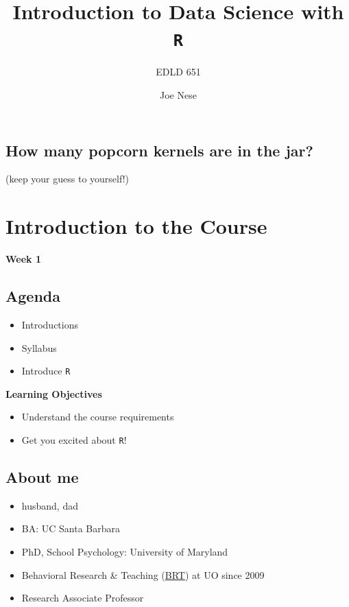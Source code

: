 \documentclass[
  letterpaper,
  DIV=11,
  numbers=noendperiod,
  oneside]{scrartcl}
\title{Introduction to Data Science with \texttt{R}}
\subtitle{EDLD 651}
\author{Joe Nese}
\date{}
\providecommand{\tightlist}{%
  \setlength{\itemsep}{0pt}\setlength{\parskip}{0pt}}\usepackage{longtable,booktabs,array}
\begin{document}
\maketitle
\ifdefined\Shaded\renewenvironment{Shaded}{\begin{tcolorbox}[borderline west={3pt}{0pt}{shadecolor}, boxrule=0pt, interior hidden, breakable, enhanced, sharp corners, frame hidden]}{\end{tcolorbox}}\fi

\hypertarget{how-many-popcorn-kernels-are-in-the-jar}{%
\subsection{How many popcorn kernels are in the
jar?}\label{how-many-popcorn-kernels-are-in-the-jar}}

(keep your guess to yourself!)

\hypertarget{introduction-to-the-course}{%
\section{Introduction to the Course}\label{introduction-to-the-course}}

\textbf{Week 1}

\hypertarget{agenda}{%
\subsection{Agenda}\label{agenda}}

\begin{itemize}
\tightlist
\item
  Introductions
\item
  Syllabus
\item
  Introduce \texttt{R}
\end{itemize}

\textbf{Learning Objectives}

\begin{itemize}
\tightlist
\item
  Understand the course requirements
\item
  Get you excited about \texttt{R}!
\end{itemize}

\hypertarget{about-me}{%
\subsection{About me}\label{about-me}}

\begin{itemize}
\tightlist
\item
  husband, dad
\item
  BA: UC Santa Barbara
\item
  PhD, School Psychology: University of Maryland
\item
  Behavioral Research \& Teaching (\href{http://brtprojects.org}{BRT})
  at UO since 2009
\item
  Research Associate Professor
\end{itemize}
\end{document}
